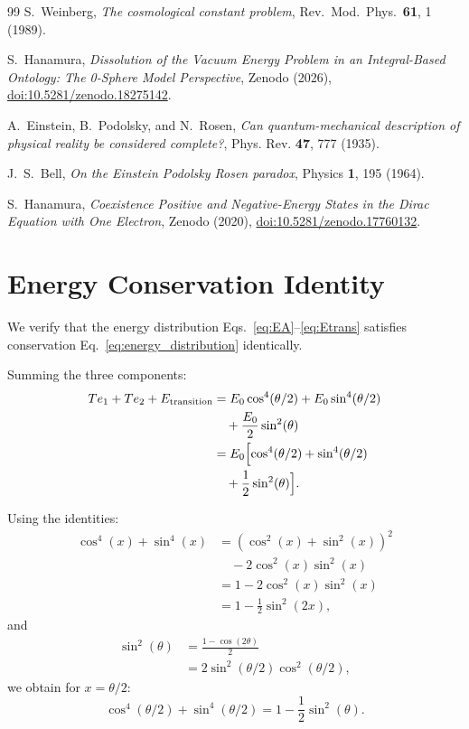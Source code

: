 \documentclass[%
 reprint,
 amsmath,amssymb,
 aps,
 prb,
]{revtex4-2}
\numberwithin{equation}{section}
\theoremstyle{definition}
\theoremstyle{remark}
\begin{document}
\begin{thebibliography}{99}
S.~Weinberg,
\emph{The cosmological constant problem},
Rev.\ Mod.\ Phys.\ \textbf{61}, 1 (1989).

S.~Hanamura,
\emph{Dissolution of the Vacuum Energy Problem in an Integral-Based Ontology: The 0-Sphere Model Perspective},
Zenodo (2026), \href{https://doi.org/10.5281/zenodo.18275142}{doi:10.5281/zenodo.18275142}.

A.~Einstein, B.~Podolsky, and N.~Rosen,
\emph{Can quantum-mechanical description of physical reality be considered complete?},
Phys. Rev. \textbf{47}, 777 (1935).

J.~S.~Bell,
\emph{On the Einstein Podolsky Rosen paradox},
Physics \textbf{1}, 195 (1964).

S.~Hanamura,
\emph{Coexistence Positive and Negative-Energy States in the Dirac Equation with One Electron},
Zenodo (2020), \href{https://doi.org/10.5281/zenodo.17760132}{doi:10.5281/zenodo.17760132}.

\end{thebibliography}

\appendix
\section{Energy Conservation Identity}
\label{app:energy_conservation}

We verify that the energy distribution Eqs.~\eqref{eq:EA}--\eqref{eq:Etrans} satisfies conservation Eq.~\eqref{eq:energy_distribution} identically.

Summing the three components:
\begin{align}
Te_1 + Te_2 + E_{\text{transition}}
&= E_0 \cos^4(\theta/2) + E_0 \sin^4(\theta/2) \nonumber \\
&\quad + \frac{E_0}{2}\sin^2(\theta) \nonumber \\
&= E_0 \Bigl[ \cos^4(\theta/2) + \sin^4(\theta/2) \nonumber \\
&\quad + \frac{1}{2}\sin^2(\theta) \Bigr].
\label{eq:sum}
\end{align}

Using the identities:
\begin{align}
\cos^4(x) + \sin^4(x)
&= (\cos^2(x) + \sin^2(x))^2 \nonumber \\
&\quad - 2\cos^2(x)\sin^2(x) \nonumber \\
&= 1 - 2\cos^2(x)\sin^2(x) \nonumber \\
&= 1 - \frac{1}{2}\sin^2(2x),
\label{eq:identity1}
\end{align}
and
\begin{align}
\sin^2(\theta) &= \frac{1 - \cos(2\theta)}{2} \nonumber \\
&= 2\sin^2(\theta/2)\cos^2(\theta/2),
\label{eq:identity2}
\end{align}
we obtain for $x = \theta/2$:
\begin{equation}
\cos^4(\theta/2) + \sin^4(\theta/2) = 1 - \frac{1}{2}\sin^2(\theta).
\label{eq:identity3}
\end{equation}
\end{document}
